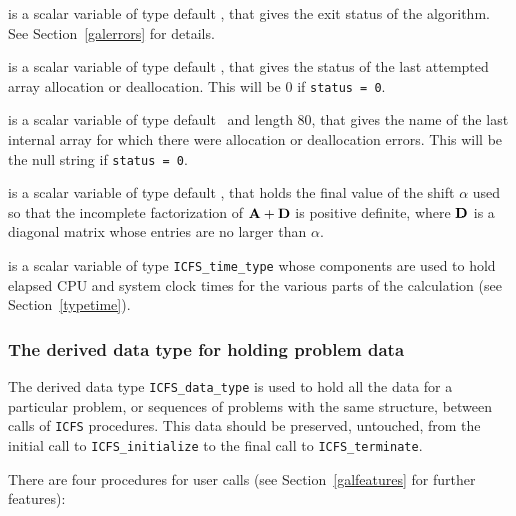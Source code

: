 \documentclass{galahad}
\newcommand{\packagename}{ICFS}
\begin{document}
\begin{description}
 is a scalar variable of type default \integer, that gives the
exit status of the algorithm. 
See Section~\ref{galerrors} for details.

 is a scalar variable of type default \integer, that gives
the status of the last attempted array allocation or deallocation.
This will be 0 if {\tt status = 0}.

 is a scalar variable of type default \character\
and length 80, that  gives the name of the last internal array 
for which there were allocation or deallocation errors.
This will be the null string if {\tt status = 0}. 

 is a scalar variable of type default \realdp, that holds
the final value of the shift $\alpha$ used so that the incomplete 
factorization of ${\mathbf{A}} + {\mathbf{D}}$ is positive definite, where ${\mathbf{D}}$ is
a diagonal matrix whose entries are no larger than $\alpha$.

 is a scalar variable of type {\tt \packagename\_time\_type}
whose components are used to hold elapsed CPU and system clock times for the
various parts of the calculation (see Section~\ref{typetime}).

\end{description}


\subsubsection{The derived data type for holding problem data}\label{typedata}
The derived data type 
{\tt \packagename\_data\_type} 
is used to hold all the data for a particular problem,
or sequences of problems with the same structure, between calls of 
{\tt \packagename} procedures. 
This data should be preserved, untouched,
from the initial call to 
{\tt \packagename\_initialize}
to the final call to
{\tt \packagename\_terminate}.


\galarguments
There are four procedures for user calls
(see Section~\ref{galfeatures} for further features): 
\end{document}
